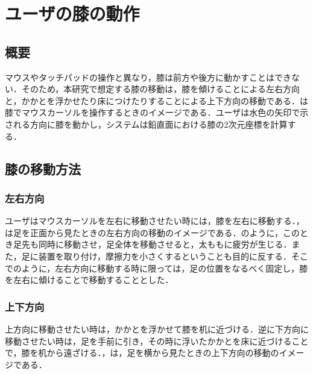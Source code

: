 \chapter{ユーザの膝の動作}
\section{概要}
マウスやタッチパッドの操作と異なり，膝は前方や後方に動かすことはできない．そのため，本研究で想定する膝の移動は，膝を傾けることによる左右方向と，かかとを浮かせたり床につけたりすることによる上下方向の移動である．は膝でマウスカーソルを操作するときのイメージである．ユーザは水色の矢印で示される方向に膝を動かし，システムは鉛直面における膝の2次元座標を計算する．

\section{膝の移動方法}
\subsection{左右方向}
ユーザはマウスカーソルを左右に移動させたい時には，膝を左右に移動する．，は足を正面から見たときの左右方向の移動のイメージである．のように，このとき足先も同時に移動させ，足全体を移動させると，太ももに疲労が生じる．また，足に装置を取り付け，摩擦力を小さくするということも目的に反する．そこでのように，左右方向に移動する時に限っては，足の位置をなるべく固定し，膝を左右に傾けることで移動することとした．
\subsection{上下方向}
上方向に移動させたい時は，かかとを浮かせて膝を机に近づける．逆に下方向に移動させたい時は，足を手前に引き，その時に浮いたかかとを床に近づけることで，膝を机から遠ざける．，は，足を横から見たときの上下方向の移動のイメージである．


